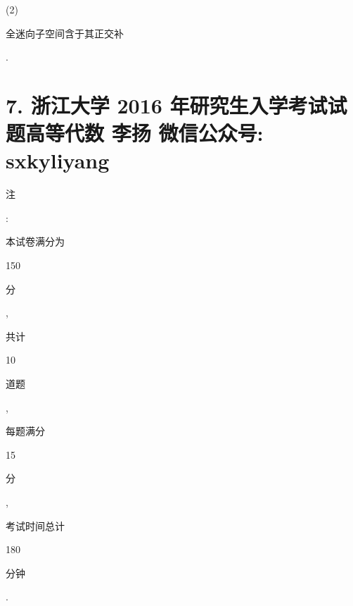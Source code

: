 \documentclass[10pt]{article}
\begin{document}
(2) \begin{CJK}{UTF8}{mj}全迷向子空间含于其正交补\end{CJK}.

\section{7. 浙江大学 2016 年研究生入学考试试题高等代数 
 李扬 
 微信公众号: sxkyliyang}
\begin{CJK}{UTF8}{mj}注\end{CJK}: \begin{CJK}{UTF8}{mj}本试卷满分为\end{CJK} 150 \begin{CJK}{UTF8}{mj}分\end{CJK}, \begin{CJK}{UTF8}{mj}共计\end{CJK} 10 \begin{CJK}{UTF8}{mj}道题\end{CJK}, \begin{CJK}{UTF8}{mj}每题满分\end{CJK} 15 \begin{CJK}{UTF8}{mj}分\end{CJK}, \begin{CJK}{UTF8}{mj}考试时间总计\end{CJK} 180 \begin{CJK}{UTF8}{mj}分钟\end{CJK}.
\end{document}
